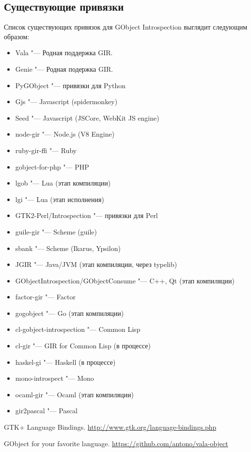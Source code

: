 \documentclass[10pt, a5paper]{article}
\begin{document}
\subsection*{Существующие привязки}

Список существующих привязок для GObject Introspection выглядит следующим образом:

\begin{itemize}
  \item Vala "--- Родная поддержка GIR.
  \item Genie "--- Родная подержка GIR.
  \item PyGObject "--- привязки для Python
  \item Gjs "--- Javascript (spidermonkey)
  \item Seed "--- Javascript (JSCore, WebKit JS engine)
  \item node-gir "--- Node.js (V8 Engine)
  \item ruby-gir-ffi "--- Ruby
  \item gobject-for-php "--- PHP
  \item lgob "--- Lua (этап компиляции)
  \item lgi "--- Lua (этап исполнения)
  \item GTK2-Perl/Introspection "--- привязки для Perl
  \item guile-gir "--- Scheme (guile)
  \item sbank "--- Scheme (Ikarus, Ypsilon)
  \item JGIR "--- Java/JVM (этап компиляции, через typelib)
  \item GObjectIntrospection/GObjectConsume "--- C++, Qt (этап компиляции)
  \item factor-gir "--- Factor
  \item gogobject "--- Go (этап компиляции)
  \item cl-gobject-introspection "--- Common Lisp
  \item cl-gir "--- GIR for Common Lisp (в процессе)
  \item haskel-gi "--- Haskell (в процессе)
  \item mono-introspect "--- Mono
  \item ocaml-gir "--- Ocaml (этап компиляции)
  \item gir2pascal "--- Pascal
\end{itemize}



\begin{thebibliography}{9}

 GTK+ Language Bindings. \url{http://www.gtk.org/language-bindings.php}

 GObject for your favorite language. \url{https://github.com/antono/vala-object}

\end{thebibliography}
\end{document}
